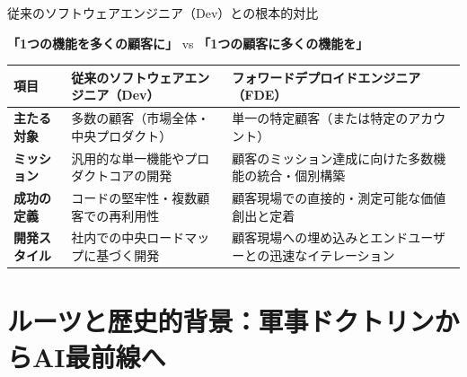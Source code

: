 \documentclass[aspectratio=169,11pt]{beamer}
\begin{document}
\begin{frame}{従来のソフトウェアエンジニア（Dev）との根本的対比}
  \begin{center}
    \textbf{「1つの機能を多くの顧客に」} \quad vs \quad \alert{\textbf{「1つの顧客に多くの機能を」}}
  \end{center}
  \vspace{0.3em}
  {\footnotesize
  \begin{tabularx}{\textwidth}{>{\bfseries}lYY}
    \toprule
    項目 & 従来のソフトウェアエンジニア（Dev） & フォワードデプロイドエンジニア（FDE） \\
    \midrule
    主たる対象 & 多数の顧客（市場全体・中央プロダクト） & 単一の特定顧客（または特定のアカウント） \\
    \addlinespace[0.4em]
    ミッション & 汎用的な単一機能やプロダクトコアの開発 & 顧客のミッション達成に向けた多数機能の統合・個別構築 \\
    \addlinespace[0.4em]
    成功の定義 & コードの堅牢性・複数顧客での再利用性 & 顧客現場での直接的・測定可能な価値創出と定着 \\
    \addlinespace[0.4em]
    開発スタイル & 社内での中央ロードマップに基づく開発 & 顧客現場への埋め込みとエンドユーザーとの迅速なイテレーション \\
    \bottomrule
  \end{tabularx}
  }
\end{frame}

\section{ルーツと歴史的背景：軍事ドクトリンからAI最前線へ}
\end{document}

